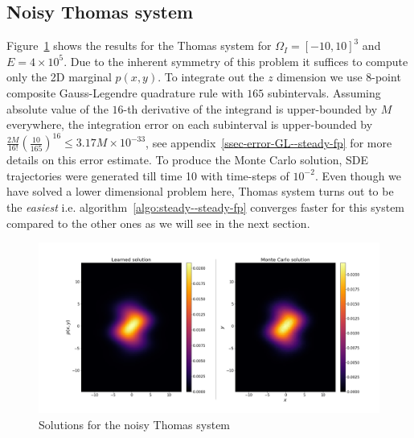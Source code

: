 \subsection{Noisy Thomas system}
Figure~\ref{fig:Thomas-steady--steady-fp} shows the results for the Thomas system for $\Omega_I = [-10, 10]^3$ and $E=4\times10^5$. Due to the inherent symmetry of this problem it suffices to compute only the 2D marginal $p(x, y)$. To integrate out the $z$ dimension we use 8-point composite Gauss-Legendre quadrature rule with $165$ subintervals. Assuming absolute value of the $16$-th derivative of the integrand is upper-bounded by $M$ everywhere, the integration error on each subinterval is upper-bounded by $\frac{2M}{16!}\left(\frac{10}{165}\right)^{16}\le3.17M\times10^{-33}$, see appendix~\ref{ssec-error-GL--steady-fp} for more details on this error estimate. To produce the Monte Carlo solution, SDE trajectories were generated till time 10 with time-steps of $10^{-2}$. Even though we have solved a lower dimensional problem here, Thomas system turns out to be the \textit{easiest} i.e. algorithm~\ref{algo:steady--steady-fp} converges faster for this system compared to the other ones as we will see in the next section.
\begin{figure}[!htp]
    \centering\includegraphics[scale=0.32]{steady-fp/plots/Thomas-steady.png}
    \caption{Solutions for the noisy Thomas system}
    \label{fig:Thomas-steady--steady-fp}
\end{figure}
